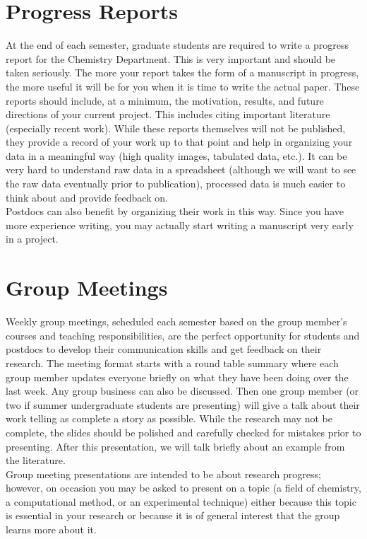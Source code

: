 \documentclass[letterpaper]{article}
\begin{document}
\section*{Progress Reports}
At the end of each semester, graduate students are required to write a progress report for the Chemistry Department. This is very important and should be taken seriously. The more your report takes the form of a manuscript in progress, the more useful it will be for you when it is time to write the actual paper. These reports should include, at a minimum, the motivation, results, and future directions of your current project. This includes citing important literature (especially recent work). While these reports themselves will not be published, they provide a record of your work up to that point and help in organizing your data in a meaningful way (high quality images, tabulated data, etc.). It can be very hard to understand raw data in a spreadsheet (although we will want to see the raw data eventually prior to publication), processed data is much easier to think about and provide feedback on.\\

Postdocs can also benefit by organizing their work in this way. Since you have more experience writing, you may actually start writing a manuscript very early in a project. 

\section*{Group Meetings}
Weekly group meetings, scheduled each semester based on the group member's courses and teaching responsibilities, are the perfect opportunity for students and postdocs to develop their communication skills and get feedback on their research. The meeting format starts with a round table summary where each group member updates everyone briefly on what they have been doing over the last week. Any group business can also be discussed. Then one group member (or two if summer undergraduate students are presenting) will give a talk about their work telling as complete a story as possible. While the research may not be complete, the slides should be polished and carefully checked for mistakes prior to presenting. After this presentation, we will talk briefly about an example from the literature.\\

Group meeting presentations are intended to be about research progress; however, on occasion you may be asked to present on a topic (a field of chemistry, a computational method, or an experimental technique) either because this topic is essential in your research or because it is of general interest that the group learns more about it. \\
\end{document}
